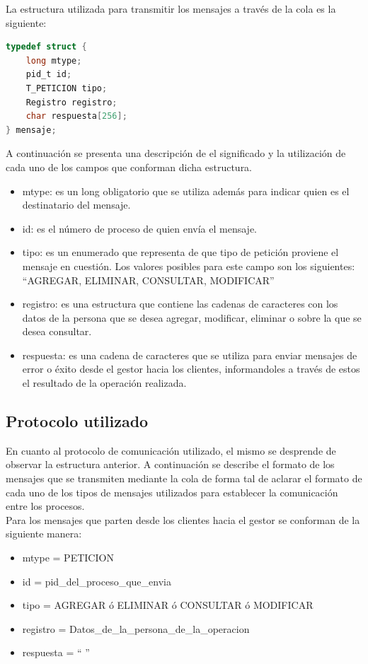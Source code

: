 \documentclass[11pt]{article}
\begin{document}
La estructura utilizada para transmitir los mensajes a trav\'es de la cola es la siguiente:

\begin{lstlisting}[language=C]
 typedef struct {
	long mtype;
	pid_t id;
	T_PETICION tipo;
	Registro registro;
	char respuesta[256];
} mensaje;
\end{lstlisting}

A continuaci\'on se presenta una descripci\'on de el significado y la utilizaci\'on de cada uno de los campos que conforman dicha estructura.
\begin{itemize}
\item mtype: es un long obligatorio que se utiliza adem\'as para indicar quien es el destinatario del mensaje.
\item id: es el n\'umero de proceso de quien env\'ia el mensaje.
\item tipo: es un enumerado que representa de que tipo de petici\'on proviene el mensaje en cuesti\'on. 
Los valores posibles para este campo son los siguientes: ``AGREGAR, ELIMINAR, CONSULTAR, MODIFICAR''
\item registro: es una estructura que contiene las cadenas de caracteres con los datos de la persona que se desea agregar, modificar, eliminar o sobre la que 
se desea consultar.
\item respuesta: es una cadena de caracteres que se utiliza para enviar mensajes de error o \'exito desde el gestor hacia los clientes, informandoles a 
trav\'es de estos el resultado de la operaci\'on realizada.
\end{itemize}


\subsection{Protocolo utilizado}

En cuanto al protocolo de comunicaci\'on utilizado, el mismo se desprende de observar la estructura anterior. A continuaci\'on se describe el formato 
de los mensajes que se transmiten mediante la cola de forma tal de aclarar el formato de cada uno de los tipos de mensajes utilizados para establecer la 
comunicaci\'on entre los procesos. \\
Para los mensajes que parten desde los clientes hacia el gestor se conforman de la siguiente manera:
\begin{itemize}
 \item mtype = PETICION
 \item id = pid\_del\_proceso\_que\_envia
 \item tipo = AGREGAR \'o ELIMINAR \'o CONSULTAR \'o MODIFICAR
 \item registro = Datos\_de\_la\_persona\_de\_la\_operacion
 \item respuesta = `` ''
\end{itemize}
\end{document}
